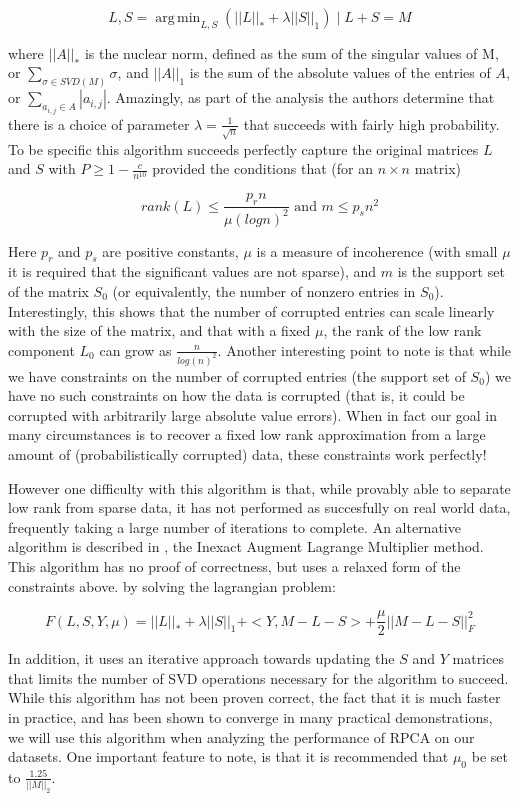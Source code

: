 \documentclass[11pt]{scrartcl} %
\DeclareMathOperator*{\argmin}{arg\,min}
\theoremstyle{plain}
\begin{document}
\[
L, S = \argmin_{L, S}(||L||_* + \lambda ||S||_1) \mid L + S = M
\]

where $||A||_*$ is the nuclear norm, defined as the sum of the singular values of M, or $\sum_{\sigma \in SVD(M)} \sigma$, and $||A||_1$ is the sum of the absolute values of the entries of $A$, or $\sum_{a_{i,j} \in A} |a_{i,j}|$. Amazingly, as part of the analysis the authors determine that there is a choice of parameter $\lambda = \frac{1}{\sqrt{n}}$ that succeeds with fairly high probability. To be specific this algorithm succeeds perfectly capture the original matrices $L$ and $S$ with $P \ge 1 - \frac{c}{n^10}$ provided the conditions that (for an $n{\times}n$ matrix)

\[
rank(L) \le \frac{p_r n}{\mu (log n)^2} \text{ and } m \le p_s n^2
\]

Here $p_r$ and $p_s$ are positive constants, $\mu$ is a measure of incoherence\cite{incoherence} (with small $\mu$ it is required that the significant values are not sparse), and $m$ is the support set of the matrix $S_0$ (or equivalently, the number of nonzero entries in $S_0$). Interestingly, this shows that the number of corrupted entries can scale linearly with the size of the matrix, and that with a fixed $\mu$, the rank of the low rank component $L_0$ can grow as $\frac{n}{log(n)^2}$. Another interesting point to note is that while we have constraints on the number of corrupted entries (the support set of $S_0$) we have no such constraints on how the data is corrupted (that is, it could be corrupted with arbitrarily large absolute value errors). When in fact our goal in many circumstances is to recover a fixed low rank approximation from a large amount of (probabilistically corrupted) data, these constraints work perfectly!

However one difficulty with this algorithm is that, while provably able to separate low rank from sparse data, it has not performed as succesfully on real world data, frequently taking a large number of iterations to complete. An alternative algorithm is described in \cite{iaml}, the Inexact Augment Lagrange Multiplier method. This algorithm has no proof of correctness, but uses a relaxed form of the constraints above. by solving the lagrangian problem:

\[
F(L, S, Y, \mu) = ||L||_* + \lambda ||S||_1 + <Y, M - L - S> + \frac{\mu}{2}||M-L-S||_F^2
\]

In addition, it uses an iterative approach towards updating the $S$ and $Y$ matrices that limits the number of SVD operations necessary for the algorithm to succeed. While this algorithm has not been proven correct, the fact that it is much faster in practice, and has been shown to converge in many practical demonstrations, we will use this algorithm when analyzing the performance of RPCA on our datasets. One important feature to note, is that it is recommended that $\mu_0$ be set to $\frac{1.25}{||M||_2}$.
\end{document}
